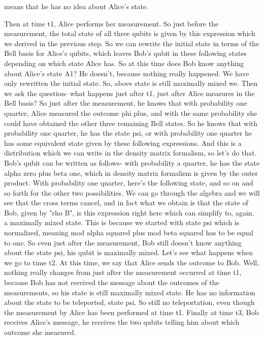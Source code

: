 means that he has no idea about Alice's state.

Then at time t1, Alice performs her measurement. So just before the measurement, the total state of all three qubits is given by this expression which we derived in the previous step. So we can rewrite the initial state in terms of the Bell basis for Alice's qubits, which leaves Bob's qubit in these following states depending on which state Alice has. So at this time does Bob know anything about Alice's state A1? He doesn't, because nothing really happened. We have only rewritten the initial state. So, above state is still maximally mixed we. Then we ask the question- what happens just after t1, just after Alice measures in the Bell basis? So just after the measurement, he knows that with probability one quarter, Alice measured the outcome phi plus, and with the same probability she could have obtained the other three remaining Bell states. So he knows that with probability one quarter, he has the state psi, or with probability one quarter he has some equivalent state given by these following expressions. And this is a distribution which we can write in the density matrix formalism, so let's do that. Bob's qubit can be written as follows- with probability a quarter, he has the state alpha zero plus beta one, which in density matrix formalism is given by the outer product. With probability one quarter, here's the following state, and so on and so forth for the other two possibilities. We can go through the algebra and we will see that the cross terms cancel, and in fact what we obtain is that the state of Bob, given by "rho B", is this expression right here which can simplify to, again, a maximally mixed state. This is because we started with state psi which is normalized, meaning mod alpha squared plus mod beta squared has to be equal to one. So even just after the measurement, Bob still doesn't know anything about the state psi, his qubit is maximally mixed. Let's see what happens when we go to time t2. At this time, we say that Alice sends the outcome to Bob. Well, nothing really changes from just after the measurement occurred at time t1, because Bob has not received the message about the outcomes of the measurements, so his state is still maximally mixed state. He has no information about the state to be teleported, state psi. So still no teleportation, even though the measurement by Alice has been performed at time t1. Finally at time t3, Bob receives Alice's message, he receives the two qubits telling him about which outcome she measured.

